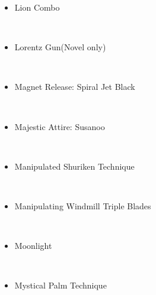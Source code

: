 \documentclass[a4paper,12pt]{article}
\begin{document}
\begin{itemize}
\item Lion Combo
\end{itemize}\\ \par \vspace{0.5cm}

\begin{itemize}
\item Lorentz Gun(Novel only)
\end{itemize}\\ \par \vspace{0.5cm}

\begin{itemize}
\item Magnet Release: Spiral Jet Black
\end{itemize}\\ \par \vspace{0.5cm}

\begin{itemize}
\item Majestic Attire: Susanoo
\end{itemize}\\ \par \vspace{0.5cm}

\begin{itemize}
\item Manipulated Shuriken Technique
\end{itemize}\\ \par \vspace{0.5cm}

\begin{itemize}
\item Manipulating Windmill Triple Blades
\end{itemize}\\ \par \vspace{0.5cm}

\begin{itemize}
\item Moonlight
\end{itemize}\\ \par \vspace{0.5cm}

\begin{itemize}
\item Mystical Palm Technique
\end{itemize}\\ \par \vspace{0.5cm}
\end{document}
